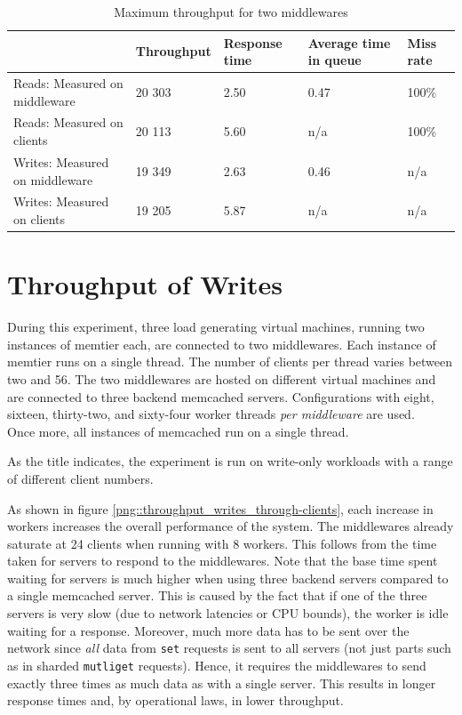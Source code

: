 \documentclass[11pt,a4paper]{article}
\begin{document}
\begin{table}[!h]
    \centering
    \begin{tabular}{|l|p{2cm}|p{2cm}|p{2cm}|p{2cm}|}
        \hline                                & Throughput & Response time & Average time in queue & Miss rate \\
        \hline Reads: Measured on middleware  &     20 303 &          2.50 &                  0.47 &     100\% \\
        \hline Reads: Measured on clients     &     20 113 &          5.60 & n/a                   &     100\% \\
        \hline Writes: Measured on middleware &     19 349 &          2.63 &                  0.46 & n/a       \\
        \hline Writes: Measured on clients    &     19 205 &          5.87 & n/a                   & n/a       \\
        \hline
    \end{tabular}
    \caption{Maximum throughput for two middlewares}
    \label{table::max_through_section_3_2mw}
\end{table}




\newpage

\section{Throughput of Writes \label{section::queue_model}}
During this experiment, three load generating virtual machines, running two instances of memtier each, are connected to two middlewares. Each instance of memtier runs on a single thread. The number of clients per thread varies between two and 56. The two middlewares are hosted on different virtual machines and are connected to three backend memcached servers. Configurations with eight, sixteen, thirty-two, and sixty-four worker threads \textit{per middleware} are used.\\
Once more, all instances of memcached run on a single thread.

As the title indicates, the experiment is run on write-only workloads with a range of different client numbers.

As shown in figure \ref{png::throughput_writes_through-clients}, each increase in workers increases the overall performance of the system. The middlewares already saturate at 24 clients when running with 8 workers. This follows from the time taken for servers to respond to the middlewares. Note that the base time spent waiting for servers is much higher when using three backend servers compared to a single memcached server. This is caused by the fact that if one of the three servers is very slow (due to network latencies or CPU bounds), the worker is idle waiting for a response. Moreover, much more data has to be sent over the network since \textit{all} data from \texttt{set} requests is sent to all servers (not just parts such as in sharded \texttt{mutliget} requests). Hence, it requires the middlewares to send exactly three times as much data as with a single server. This results in longer response times and, by operational laws, in lower throughput.
\end{document}
